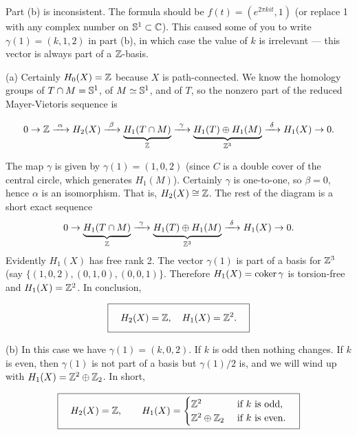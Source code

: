 {\color{red}{\bf  Mea culpa!} Part (b) is inconsistent.  The formula should be $f(t)=(e^{2\pi kit},1)$ (or replace 1 with any complex number on $\mathbb{S}^1\subset\mathbb{C}$).  This caused some of you to write $\gamma(1)=(k,1,2)$ in part (b), in which case the value of $k$ is irrelevant --- this vector is always part of a $\mathbb{Z}$-basis.}

\soln (a)
Certainly $H_0(X)=\mathbb{Z}$ because $X$ is path-connected.  We know the homology groups of $T\cap M=\mathbb{S}^1$, of $M\simeq \mathbb{S}^1$, and of $T$, so the nonzero part of the reduced Mayer-Vietoris sequence is

\[0\to \mathbb{Z}\xrightarrow{~\alpha~} H_2(X)\xrightarrow{~\beta~} \underbrace{H_1(T\cap M)}_{\mathbb{Z}}\xrightarrow{~\gamma~} \underbrace{H_1(T)\oplus H_1(M)}_{\mathbb{Z}^3}\xrightarrow{~\delta~}H_1(X) \to 0.\]

The map $\gamma$ is given by $\gamma(1)=(1,0,2)$ (since $C$ is a double cover of the central circle, which generates $H_1(M)$).  Certainly $\gamma$ is one-to-one,
so $\beta=0$, hence $\alpha$ is an isomorphism.  That is, $H_2(X)\cong\mathbb{Z}$.  The rest of the diagram is a short exact sequence
\[
 0\to \underbrace{H_1(T\cap M)}_{\mathbb{Z}}\xrightarrow{~\gamma~} \underbrace{H_1(T)\oplus H_1(M)}_{\mathbb{Z}^3}\xrightarrow{~\delta~}H_1(X)\to 0.\]
 Evidently $H_1(X)$ has free rank 2.
The vector $\gamma(1)$ is part of a basis for $\mathbb{Z}^3$ (say $\{(1,0,2),(0,1,0),(0,0,1)\}$.  Therefore $H_1(X)=\operatorname{coker} \gamma$ is torsion-free and $H_1(X)=\mathbb{Z}^2$.  In conclusion,

\[\boxed{\pad\quad H_2(X)=\Zz, \quad H_1(X)=\Zz^2.\quad}\]

(b) In this case we have $\gamma(1)=(k,0,2)$.  If $k$ is odd then nothing changes.  If $k$ is even, then $\gamma(1)$ is not part of a basis but $\gamma(1)/2$ is, and we will wind up with $H_1(X)=\mathbb{Z}^2\oplus\mathbb{Z}_2$.  In short,

\[\boxed{\pad\quad H_2(X)=\Zz, \qquad H_1(X)=\begin{cases} \Zz^2 & \text{ if $k$ is odd,}\\ \Zz^2\oplus\Zz_2 & \text{ if $k$ is even}.\end{cases}\quad}\]



